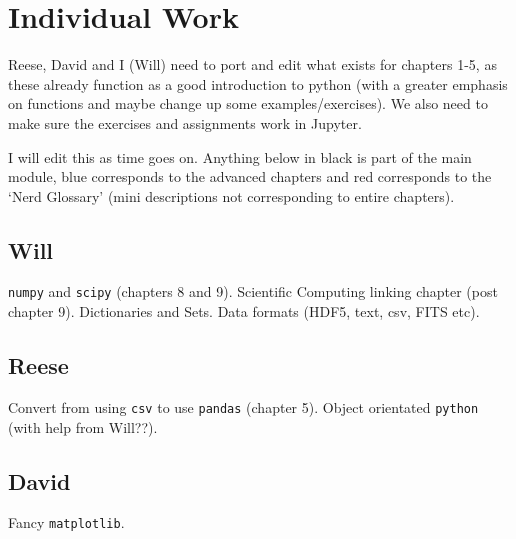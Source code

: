 \section*{Individual Work}

Reese, David and I (Will) need to port and edit what exists for chapters 1-5, as these already function as a good introduction to python (with a greater emphasis on functions and maybe change up some examples/exercises). We also need to make sure the exercises and assignments work in Jupyter.

I will edit this as time goes on. Anything below in black is part of the main module, \color{blue} blue \color{black} corresponds to the advanced chapters and \color{red} red \color{black} corresponds to the `Nerd Glossary' (mini descriptions not corresponding to entire chapters).

\subsection*{Will}

\begin{itemize}
	
\pybullet \texttt{numpy} and \texttt{scipy} (chapters 8 and 9).
\pybullet \color{blue}Scientific Computing linking chapter (post chapter 9).\color{black}
\pybullet \color{blue}Dictionaries and Sets.\color{black}
\pybullet \color{red} Data formats (HDF5, text, csv, FITS etc). \color{black}
	
\end{itemize}

\subsection*{Reese}

\begin{itemize}
	
\pybullet Convert from using \texttt{csv} to use \texttt{pandas} (chapter 5).
\pybullet \color{blue}Object orientated \texttt{python} (with help from Will??). \color{black}
	
\end{itemize}

\subsection*{David}

\begin{itemize}
	
\pybullet \color{blue}Fancy \texttt{matplotlib}.\color{black}
	
\end{itemize}

